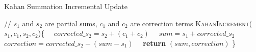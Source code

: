 \SmallCrunch
\begin{algorithm}
\caption{Kahan Summation Incremental Update} 
\label{algo:kahan}
\begin{algorithmic}
\small{
\STATE //  $s_1$ and $s_2$ are partial sums, $c_1$ and $c_2$ are correction terms
\STATE \textsc{KahanIncrement}($s_1, c_1, s_2, c_2$)\{
\STATE \ \ $corrected\_s_2 = s_2 + (c_1+c_2)$
\STATE \ \ $sum=s_1+corrected\_s_2$
\STATE \ \ $correction=corrected\_s_2-(sum - s_1)$
\STATE \ \ \textbf{return} $(sum, correction)$ \}
}
\end{algorithmic}
\end{algorithm}
\Crunch


